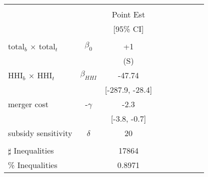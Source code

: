 \begin{tabular}{@{\extracolsep{5pt}}lcc}
\toprule 
 &  &  \\
 &  & Point Est \\
 &  & [95\% CI] \\
\midrule 
 &  &  \\
total$_{b}$ $\times$ total$_{t}$ & $\beta_0$ & +1 \\
 &  & (S) \\
HHI$_{b}$ $\times$ HHI$_{t}$ & $\beta_{HHI}$ & -47.74 \\
 &  & [-287.9, -28.4] &  &  &  &  &  &  &  \\
merger cost & -$\gamma$ & -2.3 \\
 &  & [-3.8, -0.7] \\
subsidy sensitivity & $\delta$ & 20 \\
 &  &  &  &  &  &  &  &  &  \\
\hline 
$\sharp$ Inequalities &  & 17864 \\
\% Inequalities &  & 0.8971 \\
\bottomrule 
\end{tabular}
